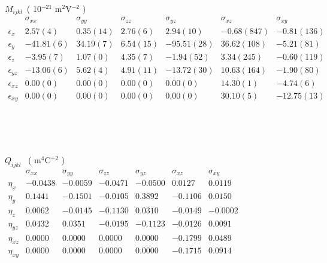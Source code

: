 \documentclass[a4paper,10pt]{article}
\begin{document}
$M_{ijkl}$~( 10$^{-21}$ m$^{2}$V$^{-2}$ )\\
$
\begin{matrix}
              & \sigma_{xx} & \sigma_{yy}  & \sigma_{zz}  & \sigma_{yz}  & \sigma_{xz}  & \sigma_{xy} \\ 
\epsilon_{x}  &   2.57(  4) &    0.35( 14) &    2.76(  6) &    2.94( 10) &   -0.68(847) &   -0.81(136) \\
\epsilon_{y}  & -41.81(  6) &   34.19(  7) &    6.54( 15) &  -95.51( 28) &   36.62(108) &   -5.21( 81) \\
\epsilon_{z}  &  -3.95(  7) &    1.07(  0) &    4.35(  7) &   -1.94( 52) &    3.34(245) &   -0.60(119) \\
\epsilon_{yz} & -13.06(  6) &    5.62(  4) &    4.91( 11) &  -13.72( 30) &   10.63(164) &   -1.90( 80) \\
\epsilon_{xz} &   0.00(  0) &    0.00(  0) &    0.00(  0) &    0.00(  0) &   14.30(  1) &   -4.74(  6) \\
\epsilon_{xy} &   0.00(  0) &    0.00(  0) &    0.00(  0) &    0.00(  0) &   30.10(  5) &  -12.75( 13) \\
\end{matrix}
$
\\
\\
\\
\\
\\
$Q_{ijkl}$ ~( m$^{4}$C$^{-2}$ )\\
$
\begin{matrix}
         &  \sigma_{xx} & \sigma_{yy} & \sigma_{zz} & \sigma_{yz} & \sigma_{xz} & \sigma_{xy} \\
\eta_{x}  & -0.0438 & -0.0059 & -0.0471 & -0.0500 &  0.0127 &  0.0119 \\ 
\eta_{y}  &  0.1441 & -0.1501 & -0.0105 &  0.3892 & -0.1106 &  0.0150 \\ 
\eta_{z}  &  0.0062 & -0.0145 & -0.1130 &  0.0310 & -0.0149 & -0.0002 \\ 
\eta_{yz} &  0.0432 &  0.0351 & -0.0195 & -0.1123 & -0.0126 &  0.0091 \\ 
\eta_{xz} &  0.0000 &  0.0000 &  0.0000 &  0.0000 & -0.1799 &  0.0489 \\ 
\eta_{xy} &  0.0000 &  0.0000 &  0.0000 &  0.0000 & -0.1715 &  0.0914 \\
\end{matrix}
$
\end{document}
